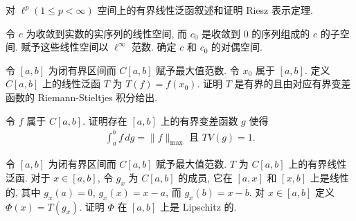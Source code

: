 \documentclass[../../main.tex]{subfiles}
\begin{document}
\begin{exercise}\label{exercise:ch08-07}
对 $\ell^{p}(1\leqslant p<\infty)$ 空间上的有界线性泛函叙述和证明 Riesz 表示定理.
\end{exercise}

\begin{exercise}\label{exercise:ch08-08}
令 $c$ 为收敛到实数的实序列的线性空间, 而 $c_{0}$ 是收敛到 $0$ 的序列组成的 $c$ 的子空间. 赋予这些线性空间以 $\ell^{\infty}$ 范数. 确定 $c$ 和 $c_{0}$ 的对偶空间.
\end{exercise}

\begin{exercise}\label{exercise:ch08-09}
令 $[a,b]$ 为闭有界区间而 $C[a,b]$ 赋予最大值范数. 令 $x_{0}$ 属于 $[a,b]$. 定义 $C[a,b]$ 上的线性泛函 $T$ 为 $T(f)=f(x_{0})$. 证明 $T$ 是有界的且由对应有界变差函数的 Riemann-Stieltjes 积分给出.
\end{exercise}

\begin{exercise}\label{exercise:ch08-10}
令 $f$ 属于 $C[a,b]$. 证明存在 $[a,b]$ 上的有界变差函数 $g$ 使得
\begin{align*}
\int_{a}^{b}f\,dg=\|f\|_{\max}\text{ 且 }TV(g)=1.
\end{align*}
\end{exercise}

\begin{exercise}\label{exercise:ch08-11}
令 $[a,b]$ 为闭有界区间而 $C[a,b]$ 赋予最大值范数. $T$ 为 $C[a,b]$ 上的有界线性泛函. 对于 $x\in[a,b]$, 令 $g_{x}$ 为 $C[a,b]$ 的成员, 它在 $[a,x]$ 和 $[x,b]$ 上是线性的, 其中 $g_{x}(a)=0$, $g_{x}(x)=x-a$, 而 $g_{x}(b)=x-b$. 对 $x\in[a,b]$ 定义 $\Phi(x)=T(g_{x})$. 证明 $\Phi$ 在 $[a,b]$ 上是 Lipschitz 的.
\end{exercise}
\end{document}
